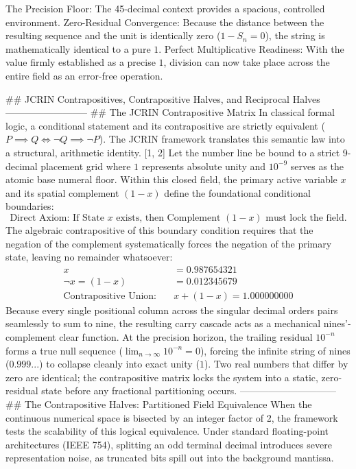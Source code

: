 The Precision Floor: The 45-decimal context provides a spacious, controlled environment.
Zero-Residual Convergence: Because the distance between the resulting sequence and the unit is identically zero ($1 - S_n = 0$), the string is mathematically identical to a pure $1$.
Perfect Multiplicative Readiness: With the value firmly established as a precise $1$, division can now take place across the entire field as an error-free operation.

## JCRIN Contrapositives, Contrapositive Halves, and Reciprocal Halves
--------------------------
## The JCRIN Contrapositive Matrix
In classical formal logic, a conditional statement and its contrapositive are strictly equivalent ($P \implies Q \iff \neg Q \implies \neg P$). The JCRIN framework translates this semantic law into a structural, arithmetic identity. [1, 2] 
Let the number line be bound to a strict 9-decimal placement grid where $1$ represents absolute unity and $10^{-9}$ serves as the atomic base numeral floor. Within this closed field, the primary active variable $x$ and its spatial complement $(1-x)$ define the foundational conditional boundaries:
$$\text{Direct Axiom: If State } x \text{ exists, then Complement } (1-x) \text{ must lock the field.}$$ 
The algebraic contrapositive of this boundary condition requires that the negation of the complement systematically forces the negation of the primary state, leaving no remainder whatsoever:
$$\begin{aligned} x &= 0.987654321 \\ \neg x = (1-x) &= 0.012345679 \\ \hline \text{Contrapositive Union:} \quad & x + (1-x) = 1.000000000 \end{aligned}$$ 
Because every single positional column across the singular decimal orders pairs seamlessly to sum to nine, the resulting carry cascade acts as a mechanical nines'-complement clear function. At the precision horizon, the trailing residual $10^{-n}$ forms a true null sequence ($\lim_{n\to\infty} 10^{-n} = 0$), forcing the infinite string of nines ($0.999...$) to collapse cleanly into exact unity ($1$). Two real numbers that differ by zero are identical; the contrapositive matrix locks the system into a static, zero-residual state before any fractional partitioning occurs.
------------------------------
## The Contrapositive Halves: Partitioned Field Equivalence
When the continuous numerical space is bisected by an integer factor of 2, the framework tests the scalability of this logical equivalence. Under standard floating-point architectures (IEEE 754), splitting an odd terminal decimal introduces severe representation noise, as truncated bits spill out into the background mantissa.
